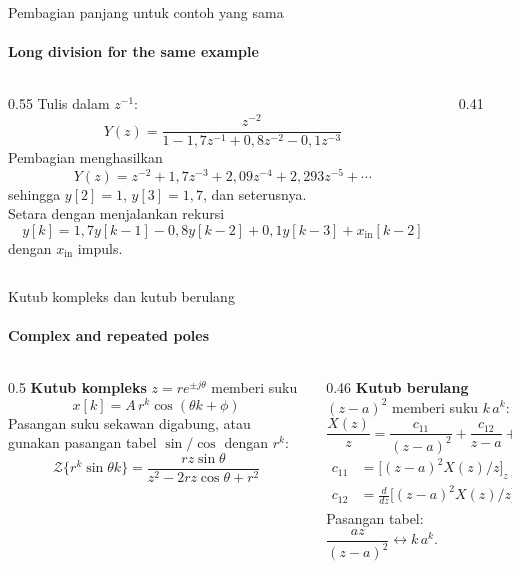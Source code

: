 \documentclass[aspectratio=169,10pt]{beamer}
\begin{document}
\begin{frame}{Pembagian panjang untuk contoh yang sama}
	\framesubtitle{Long division for the same example}
	\begin{columns}[T]
		\begin{column}{0.55\textwidth}
			\small
			Tulis dalam $z^{-1}$:
			\[
				Y(z) = \frac{z^{-2}}{1 - 1{,}7z^{-1} + 0{,}8z^{-2} - 0{,}1z^{-3}}
			\]
			Pembagian menghasilkan
			\[
				Y(z) = z^{-2} + 1{,}7z^{-3} + 2{,}09z^{-4} + 2{,}293z^{-5} + \cdots
			\]
			sehingga $y[2]=1$, $y[3]=1{,}7$, dan seterusnya.\\[4pt]
			Setara dengan menjalankan rekursi
			\[
				y[k] = 1{,}7y[k-1] - 0{,}8y[k-2] + 0{,}1y[k-3] + x_{\text{in}}[k-2]
			\]
			dengan $x_{\text{in}}$ impuls.
		\end{column}
		\begin{column}{0.41\textwidth}
			\centering
		\end{column}
	\end{columns}
\end{frame}

\begin{frame}{Kutub kompleks dan kutub berulang}
	\framesubtitle{Complex and repeated poles}
	\begin{columns}[T]
		\begin{column}{0.5\textwidth}
			\small
			\textbf{Kutub kompleks} $z = re^{\pm j\theta}$ memberi suku
			\[
				x[k] = A\,r^k\cos(\theta k + \phi)
			\]
			Pasangan suku sekawan digabung, atau gunakan pasangan tabel $\sin/\cos$ dengan $r^k$:
			\[
				\mathcal{Z}\{r^k\sin\theta k\} = \frac{rz\sin\theta}{z^2 - 2rz\cos\theta + r^2}
			\]
		\end{column}
		\begin{column}{0.46\textwidth}
			\small
			\textbf{Kutub berulang} $(z-a)^2$ memberi suku $k\,a^{k}$:
			\[
				\frac{X(z)}{z} = \frac{c_{11}}{(z-a)^2} + \frac{c_{12}}{z-a} + \cdots
			\]
			\begin{align*}
				c_{11} &= \big[(z-a)^2 X(z)/z\big]_{z=a}\\
				c_{12} &= \tfrac{d}{dz}\big[(z-a)^2X(z)/z\big]_{z=a}
			\end{align*}
			Pasangan tabel: $\dfrac{az}{(z-a)^2} \leftrightarrow k\,a^k$.
		\end{column}
	\end{columns}
\end{frame}
\end{document}
